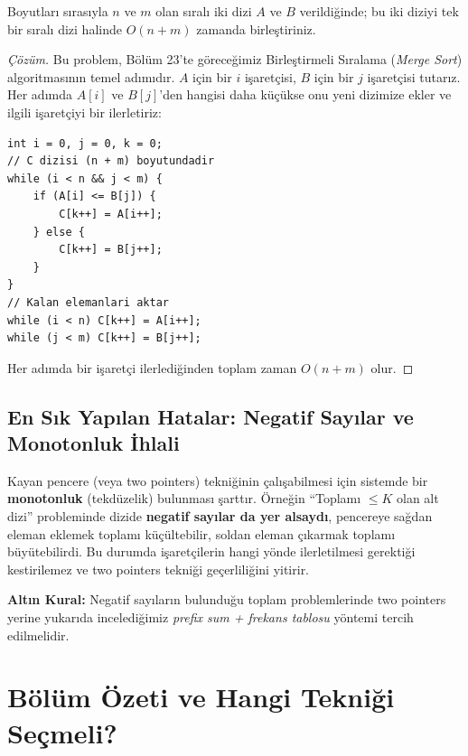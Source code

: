 \begin{example}
Boyutları sırasıyla $n$ ve $m$ olan sıralı iki dizi $A$ ve $B$ verildiğinde; bu iki diziyi tek bir sıralı dizi halinde $O(n+m)$ zamanda birleştiriniz.
\end{example}

\begin{proof}[Çözüm]
Bu problem, Bölüm 23'te göreceğimiz Birleştirmeli Sıralama (\emph{Merge Sort}) algoritmasının temel adımıdır. $A$ için bir $i$ işaretçisi, $B$ için bir $j$ işaretçisi tutarız. Her adımda $A[i]$ ve $B[j]$'den hangisi daha küçükse onu yeni dizimize ekler ve ilgili işaretçiyi bir ilerletiriz:

\begin{lstlisting}[language=CTemel]
int i = 0, j = 0, k = 0;
// C dizisi (n + m) boyutundadir
while (i < n && j < m) {
    if (A[i] <= B[j]) {
        C[k++] = A[i++];
    } else {
        C[k++] = B[j++];
    }
}
// Kalan elemanlari aktar
while (i < n) C[k++] = A[i++];
while (j < m) C[k++] = B[j++];
\end{lstlisting}
Her adımda bir işaretçi ilerlediğinden toplam zaman $O(n+m)$ olur.
\end{proof}

\subsection*{En Sık Yapılan Hatalar: Negatif Sayılar ve Monotonluk İhlali}
Kayan pencere (veya two pointers) tekniğinin çalışabilmesi için sistemde bir \textbf{monotonluk} (tekdüzelik) bulunması şarttır. Örneğin ``Toplamı $\le K$ olan alt dizi'' probleminde dizide \textbf{negatif sayılar da yer alsaydı}, pencereye sağdan eleman eklemek toplamı küçültebilir, soldan eleman çıkarmak toplamı büyütebilirdi. Bu durumda işaretçilerin hangi yönde ilerletilmesi gerektiği kestirilemez ve two pointers tekniği geçerliliğini yitirir.

\textbf{Altın Kural:} Negatif sayıların bulunduğu toplam problemlerinde two pointers yerine yukarıda incelediğimiz \emph{prefix sum + frekans tablosu} yöntemi tercih edilmelidir.

\section*{Bölüm Özeti ve Hangi Tekniği Seçmeli?}

